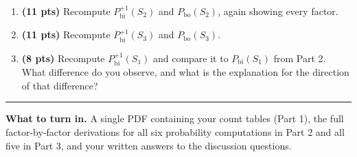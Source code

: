 \documentclass[11pt]{article}
\begin{document}
\begin{enumerate}[label=(\alph*)]
  \item \textbf{(11 pts)} Recompute $P^{+1}_{\text{bi}}(S_2)$ and $P_{\text{bo}}(S_2)$, again showing every
  factor.

  \item \textbf{(11 pts)} Recompute $P^{+1}_{\text{bi}}(S_3)$ and $P_{\text{bo}}(S_3)$.


  \item \textbf{(8 pts)} Recompute $P^{+1}_{\text{bi}}(S_1)$ and compare it to $P_{\text{bi}}(S_1)$ from Part 2. What difference do you observe, and what is the explanation for the direction of that difference? 

\end{enumerate}

\vspace{1em}
\hrule
\vspace{0.5em}
\noindent
\small
\textbf{What to turn in.} A single PDF containing your count tables (Part 1), the full factor-by-factor
derivations for all six probability computations in Part 2 and all five in Part 3, and your written answers to
the discussion questions. 
\end{document}
